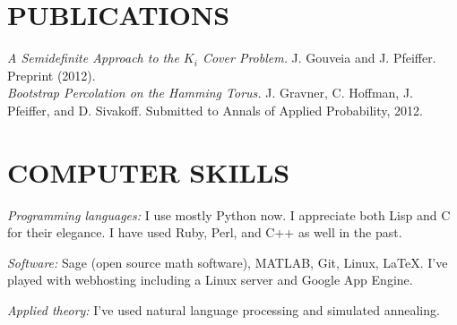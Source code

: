 \documentclass{res}
\begin{document}
\begin{resume}
\section{PUBLICATIONS}
{\em A Semidefinite Approach to the $K_i$ Cover Problem.} J. Gouveia and J. Pfeiffer. Preprint (2012).\\
{\em Bootstrap Percolation on the Hamming Torus.} J. Gravner, C. Hoffman, J. Pfeiffer, and D. Sivakoff. Submitted to Annals of Applied Probability, 2012.


\section{COMPUTER SKILLS}          
    {\em Programming languages:} I use mostly Python now. I appreciate both Lisp and C for their elegance. I have used Ruby, Perl, and C++ as well in the past.

    {\em Software:} Sage (open source math software), MATLAB, Git, Linux, \LaTeX. I've played with webhosting including a Linux server and Google App Engine. 

    {\em Applied theory:} I've used natural language processing and simulated annealing.


 
 
  
 
\end{resume}
\end{document}
